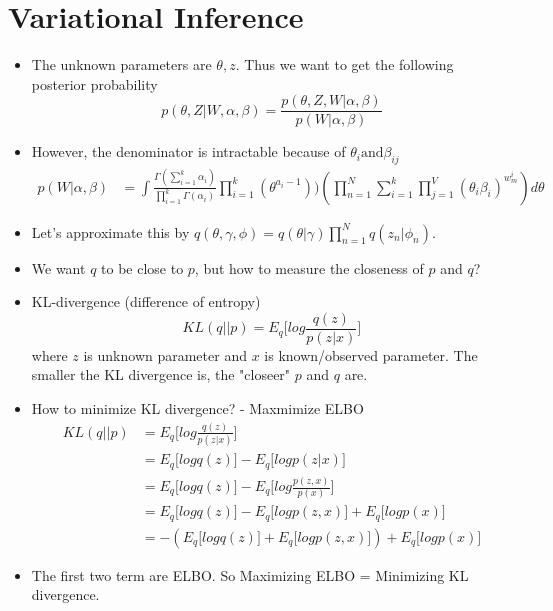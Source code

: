 \documentclass[a4paper, uplatex]{jsarticle} %
\begin{document}
\section{Variational Inference}
\begin{itemize}
\item The unknown parameters are $\theta, z$. Thus we want to get the following posterior probability
$$
p(\theta, Z| W, \alpha, \beta) = \frac{p(\theta, Z, W|\alpha, \beta)}{p(W|\alpha, \beta)} 
$$

        
\item However, the denominator is intractable because of $\theta_i \text{and} \beta_{ij}$
\begin{align*}
    p(W|\alpha, \beta) & = \int \frac{\Gamma(\sum_{i=1}^k \alpha_i)}{\prod_{i=1}^k \Gamma(\alpha_i)} \prod_{i=1}^k(\theta^{a_i-1})) (\prod_{n=1}^N \sum_{i=1}^k \prod_{j=1}^V(\theta_i \beta_i)^{w_m^i})d\theta 
\end{align*}

\item Let's approximate this by $q(\theta, \gamma, \phi) = q(\theta|\gamma) \prod_{n=1}^N q(z_n|\phi_n)$. 

\item We want $q$ to be close to $p$, but how to measure the closeness of $p$ and $q$? 

\item KL-divergence (difference of entropy)
$$
        KL(q||p) = E_q\Big[log \frac{q(z)}{p(z|x)}\Big]
$$
where $z$ is unknown parameter and $x$ is known/observed parameter. 
The smaller the KL divergence is, the "closeer" $p$ and $q$ are. 

\item How to minimize KL divergence? - Maxmimize ELBO
    \begin{align*}
    KL(q||p) & = E_q\Big[log \frac{q(z)}{p(z|x)}\Big] \\
             & = E_q\Big[log q(z)\Big] -  E_q\Big[log p(z|x)\Big] \\
             & = E_q\Big[log q(z)\Big] -  E_q\Big[log \frac{p(z,x)}{p(x)}\Big] \\
             & = E_q\Big[log q(z)\Big] -  E_q\Big[log p(z,x)\Big] + E_q\Big[log p(x)\Big] \\
             & =-(E_q\Big[log q(z)\Big] +  E_q\Big[log p(z,x)\Big]) + E_q\Big[log p(x)\Big]   
    \end{align*}

\item The first two term are ELBO. So Maximizing ELBO = Minimizing KL divergence. 


    
\end{itemize}
\end{document}
